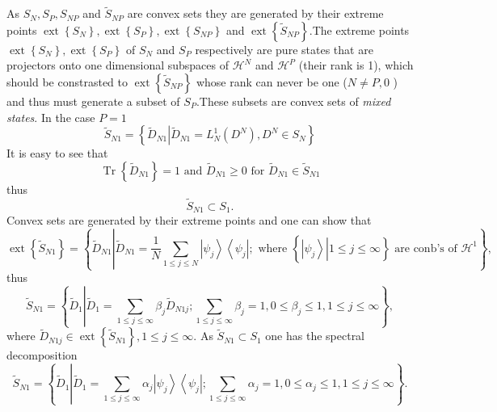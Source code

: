 \documentclass[aps,preprint]{revtex4}%
\begin{document}
As $S_{N},S_{P},S_{NP}$ and $\tilde{S}_{NP}$ are convex sets they are
generated by their extreme points $\operatorname*{ext}\left\{  S_{N}\right\}
,\operatorname*{ext}\left\{  S_{P}\right\}  ,\operatorname*{ext}\left\{
S_{NP}\right\}  $ and $\operatorname*{ext}\left\{  \tilde{S}_{NP}\right\}
.$The extreme points $\operatorname*{ext}\left\{  S_{N}\right\}
,\operatorname*{ext}\left\{  S_{P}\right\}  $ of $S_{N}$ and $S_{P}$
respectively are pure states that are projectors onto one dimensional
subspaces of $\mathcal{H}^{N}$ and $\mathcal{H}^{P}$ (their rank is 1), which
should be constrasted to $\operatorname*{ext}\left\{  \tilde{S}_{NP}\right\}
$ whose rank can never be one ($N\neq P,0$ ) and thus must generate a subset
of $S_{P}.$These subsets are convex sets of \emph{mixed states}$.$ In the case
$P=1$
\begin{equation}
\tilde{S}_{N1}=\left\{  \left.  \tilde{D}_{N1}\right\vert \tilde{D}_{N1}%
=L_{N}^{1}\left(  D^{N}\right)  ,D^{N}\in S_{N}\right\} \nonumber
\end{equation}
It is easy to see that
\begin{equation}
\operatorname*{Tr}\left\{  \tilde{D}_{N1}\right\}  =1\text{ and }\tilde
{D}_{N1}\geq0\text{ for }\tilde{D}_{N1}\in\tilde{S}_{N1}%
\end{equation}
thus
\begin{equation}
\tilde{S}_{N1}\subset S_{1}.
\end{equation}
Convex sets are generated by their extreme points and one can show that
\begin{equation}
\operatorname*{ext}\left\{  \tilde{S}_{N1}\right\}  =\left\{  \tilde{D}%
_{N1}\left\vert \tilde{D}_{N1}=\frac{1}{N}\sum_{1\leq j\leq N}\left\vert
\psi_{j}\right\rangle \left\langle \psi_{j}\right\vert ;\text{ where }\left\{
\left.  \left\vert \psi_{j}\right\rangle \right\vert 1\leq j\leq
\infty\right\}  \text{ are conb's of }\mathcal{H}^{1}\right.  \right\}  ,
\end{equation}
thus%
\begin{equation}
\tilde{S}_{N1}=\left\{  \tilde{D}_{1}\left\vert \tilde{D}_{1}=\sum_{1\leq
j\leq\infty}\beta_{j}\tilde{D}_{N1j};\sum_{1\leq j\leq\infty}\beta_{j}%
=1,0\leq\beta_{j}\leq1,1\leq j\leq\infty\right.  \right\}  ,
\end{equation}
where $\tilde{D}_{N1j}\in\operatorname*{ext}\left\{  \tilde{S}_{N1}\right\}
,1\leq j\leq\infty.$ As $\tilde{S}_{N1}\subset S_{1}$ one has the spectral
decomposition
\begin{equation}
\tilde{S}_{N1}=\left\{  \tilde{D}_{1}\left\vert \tilde{D}_{1}=\sum_{1\leq
j\leq\infty}\alpha_{j}\left\vert \psi_{j}\right\rangle \left\langle \psi
_{j}\right\vert ;\sum_{1\leq j\leq\infty}\alpha_{j}=1,0\leq\alpha_{j}%
\leq1,1\leq j\leq\infty\right.  \right\}  .
\end{equation}
\end{document}
